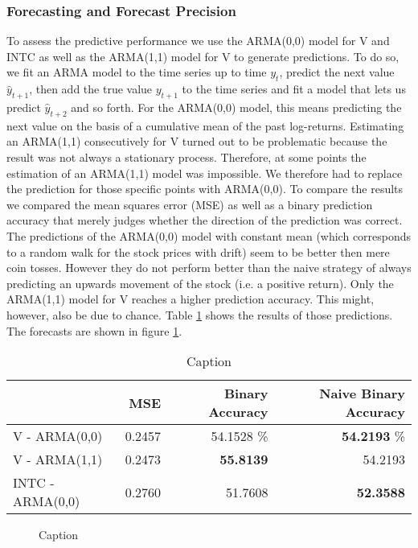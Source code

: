\subsubsection{Forecasting and Forecast Precision}
To assess the predictive performance we use the ARMA(0,0) model for V and INTC as well as the ARMA(1,1) model for V to generate predictions. To do so, we fit an ARMA model to the time series up to time $y_t$, predict the next value $\hat{y}_{t+1}$, then add the true value $y_{t+1}$ to the time series and fit a model that lets us predict $\hat{y}_{t + 2}$ and so forth. For the ARMA(0,0) model, this means predicting the next value on the basis of a cumulative mean of the past log-returns. Estimating an ARMA(1,1) consecutively for V turned out to be problematic because the result was not always a stationary process. Therefore, at some points the estimation of an ARMA(1,1) model was impossible. We therefore had to replace the prediction for those specific points with ARMA(0,0). 
To compare the results we compared the mean squares error (MSE) as well as a binary prediction accuracy that merely judges whether the direction of the prediction was correct. The predictions of the ARMA(0,0) model with constant mean (which corresponds to a random walk for the stock prices with drift) seem to be better then mere coin tosses. However they do not perform better than the naive strategy of always predicting an upwards movement of the stock (i.e. a positive return). Only the ARMA(1,1) model for V reaches a higher prediction accuracy. This might, however, also be due to chance. Table \ref{tab:V_INTC_ARMA_predictions} shows the results of those predictions. The forecasts are shown in figure \ref{fig:V_INTC_ARMA_predictions_plot}. 

\begin{table}[]
    \centering
    \begin{tabular}{lrrr}
    \toprule
    {}  & MSE & Binary Accuracy & Naive Binary Accuracy \\
    \midrule
    V - ARMA(0,0) & 0.2457 & 54.1528 \% & \textbf{54.2193} \% \\
    V - ARMA(1,1) & 0.2473 & \textbf{55.8139} & 54.2193 \\
    INTC - ARMA(0,0) & 0.2760 & 51.7608 & \textbf{52.3588} \\
    \bottomrule
    \end{tabular}
    \caption{Caption}
    \label{tab:V_INTC_ARMA_predictions}
\end{table}{}

\begin{figure}[h]
    \centering
    
    
    
    \caption{Caption}
    \label{fig:V_INTC_ARMA_predictions_plot}
\end{figure}{}


